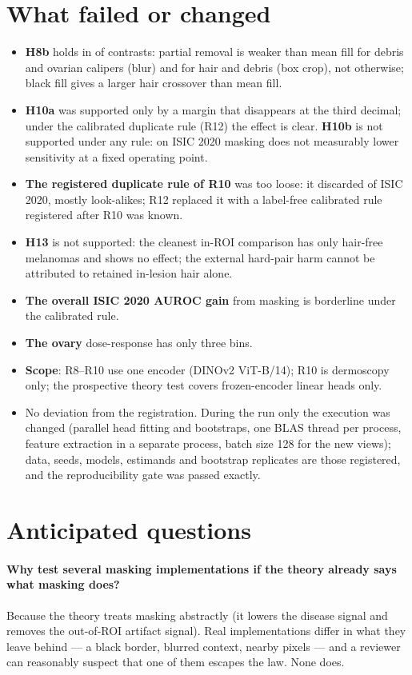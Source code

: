 \section{What failed or changed}
\begin{itemize}[leftmargin=*]\itemsep1pt
\item \textbf{H8b} holds in \sSevenHEightbConN{} of \sSevenHEightbConOf{} contrasts: partial removal is weaker than mean
fill for debris and ovarian calipers (blur) and for hair and debris (box crop), not otherwise; black fill gives a larger
hair crossover than mean fill.
\item \textbf{H10a} was supported only by a margin that disappears at the third decimal; under the calibrated duplicate
rule (R12) the effect is clear. \textbf{H10b} is not supported under any rule: on ISIC 2020 masking does not measurably
lower sensitivity at a fixed operating point.
\item \textbf{The registered duplicate rule of R10} was too loose: it discarded \sSevenDropPct{} of ISIC 2020, mostly
look-alikes; R12 replaced it with a label-free calibrated rule registered after R10 was known.
\item \textbf{H13} is not supported: the cleanest in-ROI comparison has only \sSevenHZeroMel{} hair-free melanomas and shows
no effect; the external hard-pair harm cannot be attributed to retained in-lesion hair alone.
\item \textbf{The overall ISIC 2020 AUROC gain} from masking is borderline under the calibrated rule.
\item \textbf{The ovary} dose-response has only three bins.
\item \textbf{Scope}: R8--R10 use one encoder (DINOv2 ViT-B/14); R10 is dermoscopy only; the prospective theory test
covers frozen-encoder linear heads only.
\item No deviation from the registration. During the run only the execution was changed (parallel head fitting and
bootstraps, one BLAS thread per process, feature extraction in a separate process, batch size 128 for the new views);
data, seeds, models, estimands and bootstrap replicates are those registered, and the reproducibility gate was passed
exactly.
\end{itemize}

\section{Anticipated questions}
\paragraph{Why test several masking implementations if the theory already says what masking does?} Because the theory
treats masking abstractly (it lowers the disease signal and removes the out-of-ROI artifact signal). Real implementations
differ in what they leave behind --- a black border, blurred context, nearby pixels --- and a reviewer can reasonably
suspect that one of them escapes the law. None does.
